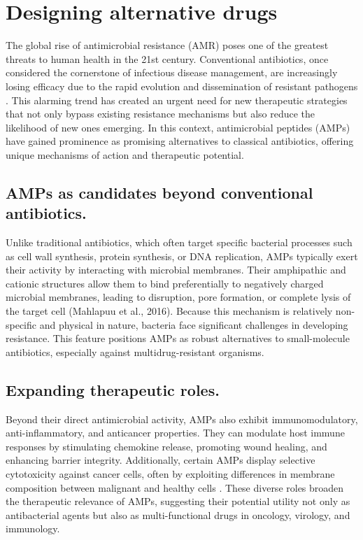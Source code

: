 \documentclass[a4paper,twoside,12pt]{book}
\begin{document}
\section{Designing alternative drugs}

The global rise of antimicrobial resistance (AMR) poses one of the greatest threats to human health in the 21st century. Conventional antibiotics, once considered the cornerstone of infectious disease management, are increasingly losing efficacy due to the rapid evolution and dissemination of resistant pathogens \cite{bib:laxminarayan2013}. This alarming trend has created an urgent need for new therapeutic strategies that not only bypass existing resistance mechanisms but also reduce the likelihood of new ones emerging. In this context, antimicrobial peptides (AMPs) have gained prominence as promising alternatives to classical antibiotics, offering unique mechanisms of action and therapeutic potential.

\subsection{AMPs as candidates beyond conventional antibiotics.}
Unlike traditional antibiotics, which often target specific bacterial processes such as cell wall synthesis, protein synthesis, or DNA replication, AMPs typically exert their activity by interacting with microbial membranes. Their amphipathic and cationic structures allow them to bind preferentially to negatively charged microbial membranes, leading to disruption, pore formation, or complete lysis of the target cell (Mahlapuu et al., 2016). Because this mechanism is relatively non-specific and physical in nature, bacteria face significant challenges in developing resistance. This feature positions AMPs as robust alternatives to small-molecule antibiotics, especially against multidrug-resistant organisms.

\subsection{Expanding therapeutic roles.}
Beyond their direct antimicrobial activity, AMPs also exhibit immunomodulatory, anti-inflammatory, and anticancer properties. They can modulate host immune responses by stimulating chemokine release, promoting wound healing, and enhancing barrier integrity. Additionally, certain AMPs display selective cytotoxicity against cancer cells, often by exploiting differences in membrane composition between malignant and healthy cells \cite{bib:felicio2017}. These diverse roles broaden the therapeutic relevance of AMPs, suggesting their potential utility not only as antibacterial agents but also as multi-functional drugs in oncology, virology, and immunology.
\end{document}
